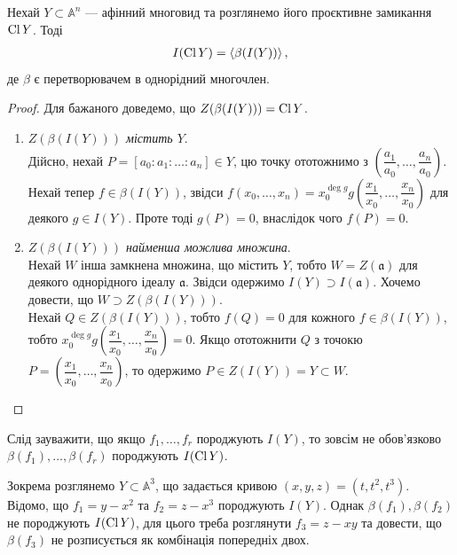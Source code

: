 \documentclass{math_library}
\begin{document}
\begin{proposition}
Нехай $Y \subset \mathbb{A}^n$ --- афінний многовид та розглянемо його проєктивне замикання $\operatorname{Cl} Y$. Тоді
\begin{align*}
I( \operatorname{Cl} Y) = \left< \beta(I(Y)) \right>,
\end{align*}
де $\beta$ є перетворювачем в однорідний многочлен.
\end{proposition}

\begin{proof}
Для бажаного доведемо, що $Z(\beta(I(Y))) = \operatorname{Cl} Y$.
\begin{enumerate}[wide=0pt,label={\Roman*.}]
\item \textit{$Z(\beta(I(Y)))$ містить $Y$}.\\
Дійсно, нехай $P = [a_0:a_1:\ldots:a_n] \in Y$, цю точку ототожнимо з $\left( \dfrac{a_1}{a_0}, \dots, \dfrac{a_n}{a_0}\right)$. Нехай тепер $f \in \beta(I(Y))$, звідси $f(x_0,\dots,x_n) = x_0^{\deg g} g\left( \dfrac{x_1}{x_0},\dots,\dfrac{x_n}{x_0}\right)$ для деякого $g \in I(Y)$. Проте тоді $g(P) = 0$, внаслідок чого $f(P) = 0$.

\item \textit{$Z(\beta(I(Y)))$ найменша можлива множина}.\\
Нехай $W$ інша замкнена множина, що містить $Y$, тобто $W = Z(\mathfrak{a})$ для деякого однорідного ідеалу $\mathfrak{a}$. Звідси одержимо $I(Y) \supset I(\mathfrak{a})$. Хочемо довести, що $W \supset Z(\beta(I(Y)))$.\\
Нехай $Q \in Z(\beta(I(Y)))$, тобто $f(Q) = 0$ для кожного $f \in \beta(I(Y))$, тобто $x_0^{\deg g} g\left( \dfrac{x_1}{x_0},\dots, \dfrac{x_n}{x_0}\right) = 0$. Якщо ототожнити $Q$ з точокю $P = \left( \dfrac{x_1}{x_0},\dots, \dfrac{x_n}{x_0}\right)$, то одержимо $P \in Z(I(Y)) = Y \subset W$. \qedhere
\end{enumerate}
\end{proof}

\begin{remark}
Слід зауважити, що якщо $f_1,\dots,f_r$ породжують $I(Y)$, то зовсім не обов'язково $\beta(f_1),\dots,\beta(f_r)$ породжують $I(\operatorname{Cl} Y)$.
\end{remark}

\begin{example}
Зокрема розглянемо $Y \subset \mathbb{A}^3$, що задається кривою $(x,y,z) = (t,t^2,t^3)$. Відомо, що $f_1 = y-x^2$ та $f_2 = z-x^3$ породжують $I(Y)$. Однак $\beta(f_1), \beta(f_2)$ не породжують $I(\operatorname{Cl} Y)$, для цього треба розглянути $f_3 = z - xy$ та довести, що $\beta(f_3)$ не розписується як комбінація попередніх двох.
\end{example}
\end{document}
